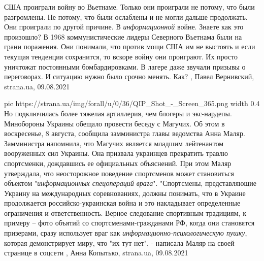 США проиграли войну во Вьетнаме.  Только они проиграли не потому, что были
разгромлены. Не потому, что были ослаблены и не могли дальше продолжать.  Они
проиграли по другой причине. В \emph{информационной} войне.  Знаете как это произошло?
В 1968 коммунистические лидеры Северного Вьетнама были на грани поражения. Они
понимали, что против мощи США им не выстоять и если текущая тенденция
сохранится, то вскоре войну они проиграют. Их просто уничтожат постоянными
бомбардировками. В лагере даже звучали призывы о переговорах. И ситуацию нужно
было срочно менять.  Как?
, 
Павел Вернивский, strana.ua, 09.08.2021

\ifcmt
  pic https://strana.ua/img/forall/u/0/36/QIP_Shot_-_Screen_365.png
  width 0.4
\fi
Но подключилась более тяжелая артиллерия, чем блогеры и экс-нардепы.
Минобороны Украины обещало провести беседу с Магучих. Об этом в воскресенье, 8
августа, сообщила замминистра главы ведомства Анна Маляр.  Замминистра
напомнила, что Магучих является младшим лейтенантом вооруженных сил Украины.
Она призвала украинцев прекратить травлю спортсменки, дождавшись ее официальных
объяснений.  При этом Маляр утверждала, что неосторожное поведение спортсменов
может становиться объектом "\emph{информационных спецопераций врага}".
"Спортсмены, представляющие Украину на международных соревнованиях, должны
понимать, что в Украине продолжается российско-украинская война и это
накладывает определенные ограничения и ответственность.  Верное следование
спортивным традициям, к примеру – фото объятий со спортсменами-гражданами РФ,
когда они становятся призерами, сразу использует враг как
\emph{информационно-психологическую пушку}, которая демонстрирует миру, что "их
тут нет", - написала Маляр на своей странице в соцсети
, 
Анна Копытько, strana.ua, 09.08.2021
